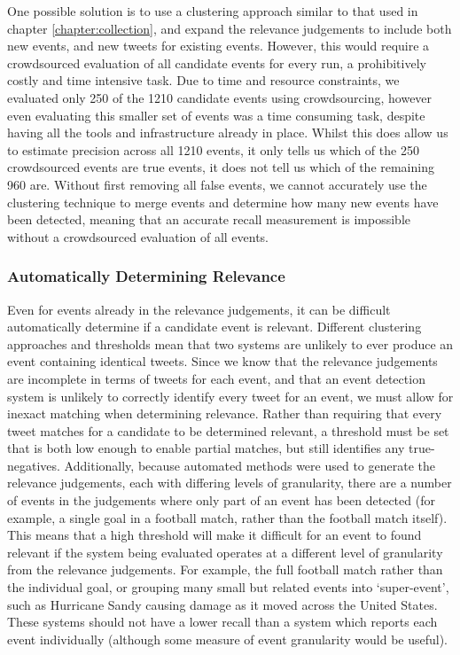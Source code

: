 One possible solution is to use a clustering approach similar to that used in chapter \ref{chapter:collection}, and expand the relevance judgements to include both new events, and new tweets for existing events.
However, this would require a crowdsourced evaluation of all candidate events for every run, a prohibitively costly and time intensive task.
Due to time and resource constraints, we evaluated only 250 of the 1210 candidate events using crowdsourcing, however even evaluating this smaller set of events was a time consuming task, despite having all the tools and infrastructure already in place.
Whilst this does allow us to estimate precision across all 1210 events, it only tells us which of the 250 crowdsourced events are true events, it does not tell us which of the remaining 960 are.
Without first removing all false events, we cannot accurately use the clustering technique to merge events and determine how many new events have been detected, meaning that an accurate recall measurement is impossible without a crowdsourced evaluation of all events.

\subsubsection{Automatically Determining Relevance}
Even for events already in the relevance judgements, it can be difficult automatically determine if a candidate event is relevant.
Different clustering approaches and thresholds mean that two systems are unlikely to ever produce an event containing identical tweets.
Since we know that the relevance judgements are incomplete in terms of tweets for each event, and that an event detection system is unlikely to correctly identify every tweet for an event, we must allow for inexact matching when determining relevance.
Rather than requiring that every tweet matches for a candidate to be determined relevant, a threshold must be set that is both low enough to enable partial matches, but still identifies any true-negatives.
Additionally, because automated methods were used to generate the relevance judgements, each with differing levels of granularity, there are a number of events in the judgements where only part of an event has been detected (for example, a single goal in a football match, rather than the football match itself).
This means that a high threshold will make it difficult for an event to found  relevant if the system being evaluated operates at a different level of granularity from the relevance judgements. For example, the full football match rather than the individual goal, or grouping many small but related events into `super-event', such as Hurricane Sandy causing damage as it moved across the United States.
These systems should not have a lower recall than a system which reports each event individually (although some measure of event granularity would be useful).

